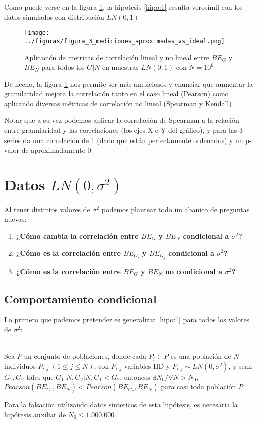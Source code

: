 Como puede verse en la figura \ref{fig:3}, la hipotesis \ref{hipo:1} resulta verosímil con los datos simulados con distribución $LN(0,1)$ 

\begin{figure}[H]
    \centering 
    \texttt{[image: ../figuras/figura\_3\_mediciones\_aproximadas\_vs\_ideal.png]} %
    \caption{Aplicación de metricas de correlación lineal y no lineal entre $BE_G$ y $BE_N$ para todos los $G | N$ en muestras $LN(0,1)$ con $N=10^6$}
    \label{fig:3}
\end{figure}

De hecho, la figura \ref{fig:3} nos permite ser más ambiciosos y enunciar que aumentar la granularidad mejora la correlación tanto en el caso lineal (Pearson) como aplicando diversas métricas de correlación no lineal (Spearman y Kendall)

Notar que a su vez podemos aplicar la correlación de Spearman a la relación entre granularidad y las correlaciones (los ejes X e Y del gráfico), y para las 3 series da una correlación de 1 (dado que están perfectamente ordenados) y un p-valor de aproximadamente 0.

\section{Datos $LN(0,\sigma^2)$}

Al tener distintos valores de $\sigma^2$ podemos plantear todo un abanico de preguntas nuevas:

\begin{enumerate}
    \item \textbf{¿Cómo cambia la correlación entre $BE_G$ y $BE_N$ condicional a $\sigma^2$?}
    \item \textbf{¿Cómo es la correlación entre $BE_{G_i}$ y $BE_{G_j}$ condicional a $\sigma^2$?}
    \item \textbf{¿Cómo es la correlación entre $BE_G$ y $BE_N$ no condicional a $\sigma^2$?}
\end{enumerate}

\subsection{Comportamiento condicional}

Lo primero que podemos pretender es generalizar \ref{hipo:1} para todos los valores de $\sigma^2$:

\begin{hipotesis}\label{hipo:2}
    \\
    Sea $P$ un conjunto de poblaciones, donde cada $P_i \in P$ es una población de $N$ individuos $P_{i,j}$ $(1 \leq j \leq N)$, con $P_{i,j}$ variables IID y $P_{i,j} \sim LN(0,\sigma^2)$, y sean $G_1, G_2$ tales que $G_1|N, G_2|N, G_1 < G_2$, entonces $\exists N_0 / \forall N > N_0 $, $Pearson(BE_{G_1},BE_N) < Pearson(BE_{G_2},BE_N)$ para casi toda población $P$
    
    Para la falsación utilizando datos sinteticos de esta hipótesis, es necesaria la hipótesis auxiliar de $N_0 \leq 1.000.000$  
\end{hipotesis}

